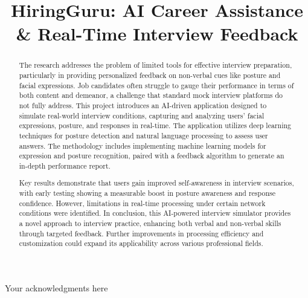 \documentclass{fast-nuces-bs}
\title{HiringGuru: AI Career Assistance & Real-Time
Interview Feedback}
\begin{document}
\begin{acknowledgements}
	Your acknowledgments here
\end{acknowledgements}

\begin{abstract}
The research addresses the problem of limited tools for effective interview preparation, particularly in providing personalized feedback on non-verbal cues like posture and facial expressions. Job candidates often struggle to gauge their performance in terms of both content and demeanor, a challenge that standard mock interview platforms do not fully address. This project introduces an AI-driven application designed to simulate real-world interview conditions, capturing and analyzing users’ facial expressions, posture, and responses in real-time. The application utilizes deep learning techniques for posture detection and natural language processing to assess user answers. The methodology includes implementing machine learning models for expression and posture recognition, paired with a feedback algorithm to generate an in-depth performance report.

Key results demonstrate that users gain improved self-awareness in interview scenarios, with early testing showing a measurable boost in posture awareness and response confidence. However, limitations in real-time processing under certain network conditions were identified. In conclusion, this AI-powered interview simulator provides a novel approach to interview practice, enhancing both verbal and non-verbal skills through targeted feedback. Further improvements in processing efficiency and customization could expand its applicability across various professional fields.
\end{abstract}














%


 
\end{document}
